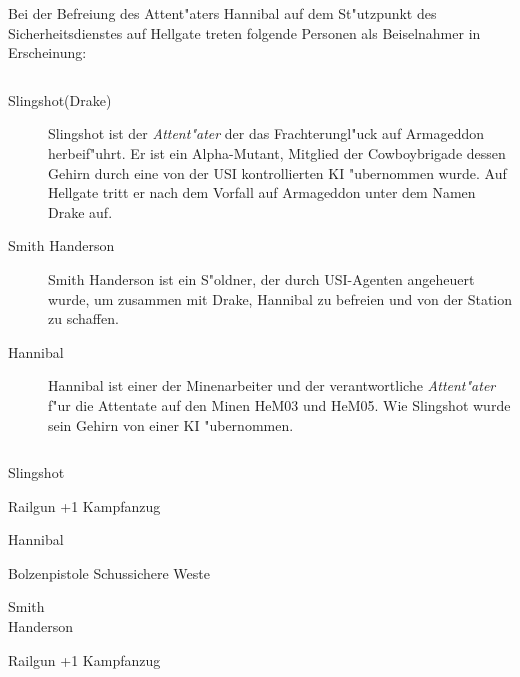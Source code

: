 \newpage
{}

Bei der Befreiung des Attent"aters Hannibal auf dem St"utzpunkt des Sicherheitsdienstes auf Hellgate treten folgende Personen 
als Beiselnahmer in Erscheinung:

\begin{column}[l]{0.45}
    \begin{description}
        \item[Slingshot(Drake)] Slingshot ist der \emph{Attent"ater} der das Frachterungl"uck auf Armageddon herbeif"uhrt. Er ist 
            ein Alpha-Mutant, Mitglied der Cowboybrigade dessen Gehirn durch eine von der USI kontrollierten KI "ubernommen wurde. 
            Auf Hellgate tritt er nach dem Vorfall auf Armageddon unter dem Namen Drake auf.
        \item[Smith Handerson] Smith Handerson ist ein S"oldner, der durch USI-Agenten angeheuert wurde, um 
            zusammen mit Drake, Hannibal zu befreien und von der Station zu schaffen.
        \item[Hannibal] Hannibal ist einer der Minenarbeiter und der verantwortliche \emph{Attent"ater} f"ur die Attentate auf den Minen 
            HeM03 und HeM05. Wie Slingshot wurde sein Gehirn von einer KI "ubernommen.
    \end{description}
\end{column}
\begin{column}[r]{0.45}
    \begin{nscsheet}[h]{Slingshot}
        \nscstats[ATT=1,AGG=2,DEX=3]
        \nscruler
        \begin{nscinventory}
            \nscitem[Waffen] Railgun +1
            \nscitem[R"ustung] Kampfanzug
        \end{nscinventory}
    \end{nscsheet}    

    \begin{nscsheet}[h]{Hannibal}
        \nscstats[ATT=1,AGG=2,DEX=3,COM=2,CON=2]
        \nscruler
        \begin{nscinventory}
            \nscitem[Waffen] Bolzenpistole
            \nscitem[R"ustung] Schussichere Weste
        \end{nscinventory}
    \end{nscsheet} 

    \begin{nscsheet}[h]{Smith\\ Handerson}
        \nscstats[ATT=3,AGG=2]
        \nscruler
        \begin{nscinventory}
            \nscitem[Waffen] Railgun +1
            \nscitem[R"ustung] Kampfanzug
        \end{nscinventory}
    \end{nscsheet}
\end{column}

\newpage